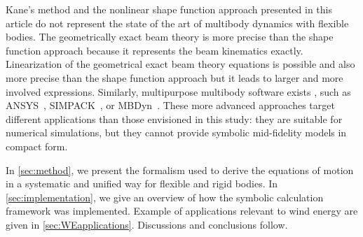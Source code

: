 \documentclass[wes, manuscript]{copernicus}
\begin{document}
Kane's method and the nonlinear shape function approach presented in this article do not represent the state of the art of multibody dynamics with flexible bodies. 
The geometrically exact beam theory \citep{Simo:1985,Jelenic:1999,Geradin:2001:book,Bauchau:2011:book} is more precise than the shape function approach because it represents the beam kinematics exactly. 
Linearization of the geometrical exact beam theory equations is possible and also more precise than the shape function approach but it leads to larger and more involved expressions.
Similarly, multipurpose multibody software exists \citep{Lange:2007}, such as ANSYS~\citep{ansys}, SIMPACK~\citep{simpack}, or MBDyn~\citep{MBDyn}. 
These more advanced approaches target different applications than those envisioned in this study: they are suitable for numerical simulations, but they cannot provide symbolic mid-fidelity models in compact form.





In \autoref{sec:method}, we present the formalism used to derive the equations of motion in a systematic and unified way for flexible and rigid bodies. 
In \autoref{sec:implementation}, we give an overview of how the symbolic calculation framework was implemented.
Example of applications relevant to wind energy are given in \autoref{sec:WEapplications}.
Discussions and conclusions follow.



\end{document}
